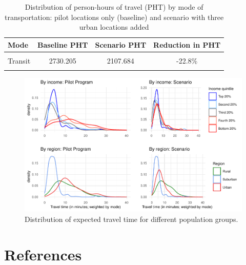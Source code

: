 \documentclass[]{elsarticle} %
\begin{document}
\begin{table}

\caption{\label{tab:table-results-by-mode}\label{tab:distribution-results-by-mode}Distribution of person-hours of travel (PHT) by mode of transportation: pilot locations only (baseline) and scenario with three urban locations added}
\centering
\begin{tabular}[t]{lccc}
\toprule
Mode & Baseline PHT & Scenario PHT & Reduction in PHT\\
\midrule
\cellcolor{gray!6}{Car} & \cellcolor{gray!6}{8535.429} & \cellcolor{gray!6}{7092.220} & \cellcolor{gray!6}{-16.91\%}\\
Transit & 2730.205 & 2107.684 & -22.8\%\\
\cellcolor{gray!6}{Walking} & \cellcolor{gray!6}{2197.179} & \cellcolor{gray!6}{1201.223} & \cellcolor{gray!6}{-45.33\%}\\
\bottomrule
\end{tabular}
\end{table}

\begin{figure}

{\centering \includegraphics{Accessibility-Vaccination-Sites-Hamilton_files/figure-latex/figure-results-1} 

}

\caption{\label{fig:results}Distribution of expected travel time for different population groups.}\label{fig:figure-results}
\end{figure}

\hypertarget{references}{%
\section*{References}\label{references}}
\end{document}
